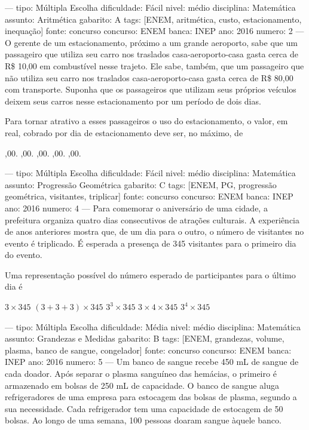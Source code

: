 
---
tipo: Múltipla Escolha
dificuldade: Fácil
nivel: médio
disciplina: Matemática
assunto: Aritmética
gabarito: A
tags: [ENEM, aritmética, custo, estacionamento, inequação]
fonte: concurso
concurso: ENEM
banca: INEP
ano: 2016
numero: 2
---
\question
O gerente de um estacionamento, próximo a um grande aeroporto, sabe que um passageiro que utiliza seu carro nos traslados casa-aeroporto-casa gasta cerca de R\$ 10,00 em combustível nesse trajeto. Ele sabe, também, que um passageiro que não utiliza seu carro nos traslados casa-aeroporto-casa gasta cerca de R\$ 80,00 com transporte. Suponha que os passageiros que utilizam seus próprios veículos deixem seus carros nesse estacionamento por um período de dois dias.

Para tornar atrativo a esses passageiros o uso do estacionamento, o valor, em real, cobrado por dia de estacionamento deve ser, no máximo, de
\begin{choices}
,00.
,00.
,00.
,00.
,00.
\end{choices}

---
tipo: Múltipla Escolha
dificuldade: Fácil
nivel: médio
disciplina: Matemática
assunto: Progressão Geométrica
gabarito: C
tags: [ENEM, PG, progressão geométrica, visitantes, triplicar]
fonte: concurso
concurso: ENEM
banca: INEP
ano: 2016
numero: 4
---
\question
Para comemorar o aniversário de uma cidade, a prefeitura organiza quatro dias consecutivos de atrações culturais. A experiência de anos anteriores mostra que, de um dia para o outro, o número de visitantes no evento é triplicado. É esperada a presença de 345 visitantes para o primeiro dia do evento.

Uma representação possível do número esperado de participantes para o último dia é
\begin{choices}
\choice $3 \times 345$
\choice $(3 + 3 + 3) \times 345$
\CorrectChoice $3^3 \times 345$
\choice $3 \times 4 \times 345$
\choice $3^4 \times 345$
\end{choices}

---
tipo: Múltipla Escolha
dificuldade: Média
nivel: médio
disciplina: Matemática
assunto: Grandezas e Medidas
gabarito: B
tags: [ENEM, grandezas, volume, plasma, banco de sangue, congelador]
fonte: concurso
concurso: ENEM
banca: INEP
ano: 2016
numero: 5
---
\question
Um banco de sangue recebe 450 mL de sangue de cada doador. Após separar o plasma sanguíneo das hemácias, o primeiro é armazenado em bolsas de 250 mL de capacidade. O banco de sangue aluga refrigeradores de uma empresa para estocagem das bolsas de plasma, segundo a sua necessidade. Cada refrigerador tem uma capacidade de estocagem de 50 bolsas. Ao longo de uma semana, 100 pessoas doaram sangue àquele banco.

